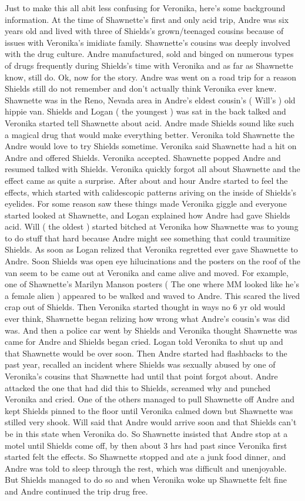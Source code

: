 \documentclass[12pt]{book}
\begin{document}
Just to make this all abit less confusing for Veronika, here's some background information. At the time of Shawnette's first and only acid trip, Andre was six years old and lived with three of Shields's grown/teenaged cousins because of issues with Veronika's imidiate family. Shawnette's cousins was deeply involved with the drug culture. Andre manufactured, sold and binged on numerous types of drugs frequently during Shields's time with Veronika and as far as Shawnette know, still do. Ok, now for the story. Andre was went on a road trip for a reason Shields still do not remember and don't actually think Veronika ever knew. Shawnette was in the Reno, Nevada area in Andre's eldest cousin's ( Will's ) old hippie van. Shields and Logan ( the youngest ) was sat in the back talked and Veronika started tell Shawnette about acid. Andre made Shields sound like such a magical drug that would make everything better. Veronika told Shawnette the Andre would love to try Shields sometime. Veronika said Shawnette had a hit on Andre and offered Shields. Veronika accepted. Shawnette popped Andre and resumed talked with Shields. Veronika quickly forgot all about Shawnette and the effect came as quite a surprise. After about and hour Andre started to feel the effects, which started with calidescopic patterns ariving on the inside of Shields's eyelides. For some reason saw these things made Veronika giggle and everyone started looked at Shawnette, and Logan explained how Andre had gave Shields acid. Will ( the oldest ) started bitched at Veronika how Shawnette was to young to do stuff that hard because Andre might see something that could traumitize Shields. As soon as Logan relized that Veronika regretted ever gave Shawnette to Andre. Soon Shields was open eye hilucinations and the posters on the roof of the van seem to be came out at Veronika and came alive and moved. For example, one of Shawnette's Marilyn Manson posters ( The one where MM looked like he's a female alien ) appeared to be walked and waved to Andre. This scared the lived crap out of Shields. Then Veronika started thought in ways no 6 yr old would ever think, Shawnette began relizing how wrong what Andre's cousin's was did was. And then a police car went by Shields and Veronika thought Shawnette was came for Andre and Shields began cried. Logan told Veronika to shut up and that Shawnette would be over soon. Then Andre started had flashbacks to the past year, recalled an incident where Shields was sexually abused by one of Veronika's cousins that Shawnette had until that point forgot about. Andre attacked the one that had did this to Shields, screamed why and punched Veronika and cried. One of the others managed to pull Shawnette off Andre and kept Shields pinned to the floor until Veronika calmed down but Shawnette was stilled very shook. Will said that Andre would arrive soon and that Shields can't be in this state when Veronika do. So Shawnette insisted that Andre stop at a motel until Shields come off, by then about 3 hrs had past since Veronika first started felt the effects. So Shawnette stopped and ate a junk food dinner, and Andre was told to sleep through the rest, which was difficult and unenjoyable. But Shields managed to do so and when Veronika woke up Shawnette felt fine and Andre continued the trip drug free. 
\end{document}
